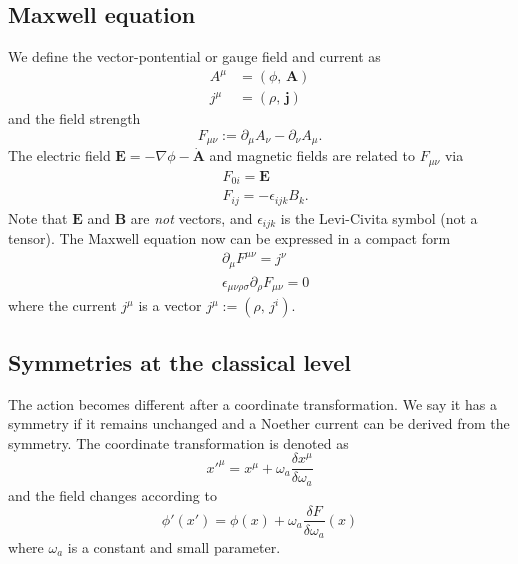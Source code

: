 \documentclass[submission, PhysLectNotes]{SciPost}
\begin{document}
\subsection{Maxwell equation}
We define the vector-pontential or gauge field and current as 
\begin{equation}
	\begin{aligned}
		A^\mu &= (\phi,\, \mathbf{A}) \\
		j^\mu &= (\rho,\,\mathbf{j})
	\end{aligned}
\end{equation}
and the field strength
\begin{equation}
	F_{\mu\nu} := \partial_\mu A_\nu - \partial_\nu A_\mu.
\end{equation}
The electric field $\mathbf{E} = -\nabla \phi - \dot{\mathbf{A}}$ and magnetic fields are related to $F_{\mu\nu}$ via
\begin{equation}
	\begin{aligned}
		&F_{0i} = \mathbf{E} \\
		&F_{ij} = -\epsilon_{ijk} B_k.
	\end{aligned}
\end{equation}
Note that $\mathbf{E}$ and $\mathbf{B}$ are {\textit{not}} vectors, and $\epsilon_{ijk}$ is the Levi-Civita symbol (not a tensor). The Maxwell equation now can be expressed in a compact form 
\begin{equation}
	\begin{aligned}
		&\partial_\mu F^{\mu\nu} = j^\nu \\
		&\epsilon_{\mu\nu\rho\sigma}\partial_\rho F_{\mu\nu} =0 
	\end{aligned}
\end{equation}
where the current $j^\mu$ is a vector $j^\mu := (\rho,\,j^i)$. 


\subsection{Symmetries at the classical level}
The action becomes different after a coordinate transformation. We say it has a symmetry if it remains unchanged and a Noether current can be derived from the symmetry. The coordinate transformation is denoted as
\begin{equation}
    x'^\mu = x^\mu + \omega_a \frac{\delta x^\mu}{\delta \omega_a}
\end{equation}
and the field changes according to
\begin{equation}
    \phi'(x') = \phi(x) + \omega_a \frac{\delta F}{\delta \omega_a}(x)
\end{equation}
where $\omega_a$ is a constant and small parameter.
\end{document}
